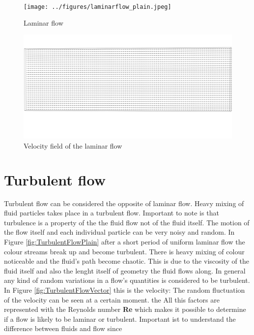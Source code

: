 \begin{figure}[htp]
\centering
\texttt{[image: ../figures/laminarflow\_plain.jpeg]}
\caption{Laminar flow}
\label{fig:LaminarFlowPlain}
\end{figure}

\begin{figure}[htp]
\centering
\includegraphics[scale=0.05]{../figures/laminarflow_vectors.png}
\caption{Velocity field of the laminar flow}
\label{LaminarFlowVector}
\end{figure}



\section{Turbulent flow}

Turbulent flow can be considered the opposite of laminar flow. Heavy mixing of fluid particles takes place in a turbulent flow. Important to note is that turbulence is a property of the the fluid flow not of the fluid itself. The motion of the flow itself and
each individual particle can be very noisy and random. In Figure \ref{fig:TurbulentFlowPlain} after a short period of uniform laminar flow the colour streams break up
and become turbulent. There is heavy mixing of colour noticeable and the fluid's path become chaotic. This is due to the viscosity of the fluid itself and also the lenght itself of geometry the fluid
flows along. In general any kind of random variations in a flow's quantities is considered to be turbulent. In Figure \ref{fig:TurbulentFlowVector} this is the velocity: The random fluctuation of the velocity can be seen at a certain moment. the All this factors are represented with the Reynolds number \textbf{Re} which makes it possible to determine if a flow is likely to be laminar or
turbulent. Important ist to understand the difference between fluids and flow since 


